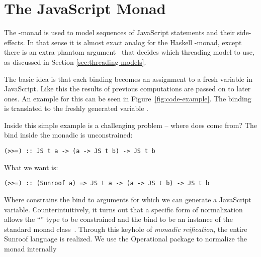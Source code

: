  
\section{The JavaScript Monad}
\label{sec:js-monad}

The \JS-monad is
used to model sequences of JavaScript statements and
their side-effects. In that sense it is almost
exact analog for the Haskell \IO-monad, except there
is an extra phantom argument~\cite{Leijen:99:Phantom} 
that decides which threading model to use, as
discussed in Section \ref{sec:threading-models}.

The basic idea is that each binding becomes an
assignment to a fresh variable in JavaScript. Like
this the results of previous computations are passed on to 
later ones.
An example for this can be seen in Figure~\ref{fig:code-example}.
The binding  is translated to the freshly generated
variable .

Inside this simple example is a challenging problem -- where does
 come from? The bind inside the monadic  is
unconstrained:
\begin{verbatim}
(>>=) :: JS t a -> (a -> JS t b) -> JS t b
\end{verbatim}
What we want is:
\begin{verbatim}
(>>=) :: (Sunroof a) => JS t a -> (a -> JS t b) -> JS t b
\end{verbatim}
Where  constrains the bind to
arguments for which we can generate a JavaScript variable.
Counterintuitively, 
it turns out that a specific form of normalization allows 
the ``'' type to be constrained and the bind to 
be an instance of the standard monad class~\cite{Sculthorpe:13:ConstrainedMonads}.
Through this keyhole of {\em monadic reification},
the entire Sunroof language is realized. We 
use the Operational package \cite{Apfelmus:10:Operational,Hackage:10:Operational}
to normalize the monad internally

